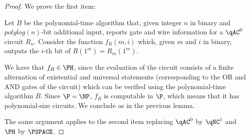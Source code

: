 \begin{proof}
	We prove the first item:

	Let $B$ be the polynomial-time algorithm that, given integer $n$
	in binary and $polylog(n)$-bit additional input, reports gate and wire information
	for a $\qAC^0$ circuit $R_n$. Consider the function $f_R(m, i)$ which, 
	given $m$ and $i$ in binary, outputs the $i$-th bit of $R(1^m) = R_m(1^m)$.

	We have that $f_R \in \PH$, since the evaluation of the circuit consists 
	of a finite alternation of existential and universal statements (corresponding to the 
	OR and AND gates of the circuit) which can be verified using the polynomial-time
	algorithm $B$. Since $\P = \NP$, $f_R$ is computable in $\P$, which means that it has 
	polynomial-size circuits. We conclude as in the previous lemma. 

	The same argument applies to the second item replacing $\qAC^0$ by $\qNC^1$ and $\PH$ by $\PSPACE$. 
\end{proof}

